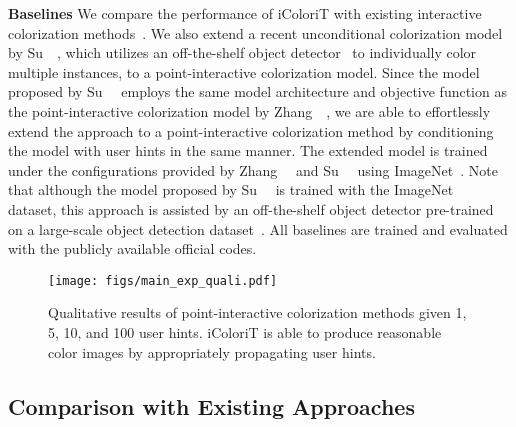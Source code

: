 \documentclass[10pt,twocolumn,letterpaper]{article}
\begin{document}
\noindent \textbf{Baselines}
We compare the performance of iColoriT with existing interactive colorization methods~\cite{zhang2017, side}. 
We also extend a recent unconditional colorization model by Su~\etal~\cite{instanceaware}, which utilizes an off-the-shelf object detector~\cite{maskrcnn} to individually color multiple instances, to a point-interactive colorization model. 
Since the model proposed by Su~\etal~\cite{instanceaware} employs the same model architecture and objective function as the point-interactive colorization model by Zhang~\etal~\cite{zhang2017}, we are able to effortlessly extend the approach to a point-interactive colorization method by conditioning the model with user hints in the same manner. 
The extended model is trained under the configurations provided by Zhang~\etal~\cite{zhang2017} and Su~\etal~\cite{instanceaware} using ImageNet~\cite{imagenet}. 
Note that although the model proposed by Su~\etal~\cite{instanceaware} is trained with the ImageNet~\cite{imagenet} dataset, this approach is assisted by an off-the-shelf object detector pre-trained on a large-scale object detection dataset~\cite{coco}. 
All baselines are trained and evaluated with the publicly available official codes. 


\begin{figure*}[ht]
    \centering
    \texttt{[image: figs/main\_exp\_quali.pdf]}
\caption{Qualitative results of point-interactive colorization methods given 1, 5, 10, and 100 user hints. iColoriT is able to produce reasonable color images by appropriately propagating user hints. }
    \label{fig:exp_quali}
    \vspace{-0.5cm}
\end{figure*}

\vspace{-0.1cm}
\subsection{Comparison with Existing Approaches}
\label{sec:quanti}
\vspace{-0.1cm}
\end{document}
